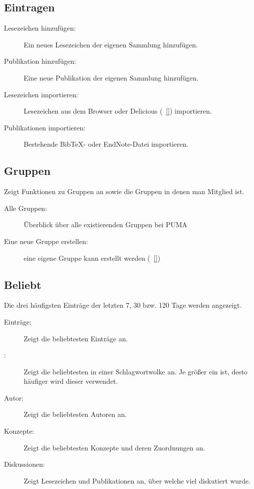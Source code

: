 \subsection{Eintragen}
\label{subsec:eintragen}
\begin{description}
    \item [Lesezeichen hinzufügen:] Ein neues Lesezeichen der eigenen Sammlung hinzufügen.  
    \item [Publikation hinzufügen:] Eine neue Publikation der eigenen Sammlung hinzufügen. 
    \item [Lesezeichen importieren:] Lesezeichen aus dem Browser oder Delicious (~\autoref{}) importieren.
    \item [Publikationen importieren:] Bestehende BibTeX- oder EndNote-Datei importieren.
\end{description}

\subsection{Gruppen}
\label{subsec:gruppen}
Zeigt Funktionen zu Gruppen an sowie die Gruppen in denen man Mitglied ist.
\begin{description}
    \item [Alle Gruppen:] Überblick über alle existierenden Gruppen bei PUMA
    \item [Eine neue Gruppe erstellen:] eine eigene Gruppe kann erstellt werden (~\autoref{})
\end{description}
\subsection{Beliebt}
\label{subsec:beliebt}
Die drei häufigsten Einträge der letzten 7, 30 bzw. 120 Tage werden angezeigt.
\begin{description}
    \item [Einträge:] Zeigt die beliebtesten Einträge an.
    \item [\tags:] Zeigt die beliebtesten \tags in einer Schlagwortwolke an. Je größer ein \tag ist, desto häufiger wird dieser verwendet.
    \item [Autor:] Zeigt die beliebtesten Autoren an.
    \item [Konzepte:] Zeigt die beliebtesten Konzepte und deren Zuordnungen an. 
    \item [Diskussionen:] Zeigt Lesezeichen und Publikationen an, über welche viel diskutiert wurde. 
\end{description}
